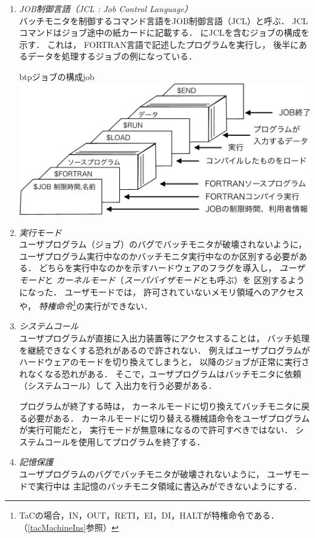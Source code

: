 \begin{enumerate}
\item \emph{JOB制御言語（JCL : Job Control Language）} \\
  バッチモニタを制御するコマンド言語をJOB制御言語（JCL）と呼ぶ．
  JCLコマンドはジョブ途中の紙カードに記載する．
  にJCLを含むジョブの構成を示す．
  これは，
  FORTRAN言語で記述したプログラムを実行し，
  後半にあるデータを処理するジョブの例になっている．

  \begin{myfig}{btp}{ジョブの構成}{job}
    \includegraphics[scale=0.6]{Fig/job-crop.pdf}
  \end{myfig}

\item \emph{実行モード} \\
  ユーザプログラム（ジョブ）のバグでバッチモニタが破壊されないように，
  ユーザプログラム実行中なのかバッチモニタ実行中なのか区別する必要がある．
  どちらを実行中なのかを示すハードウェアのフラグを導入し，
  \emph{ユーザモード}と
  \emph{カーネルモード}（\emph{スーパバイザモード}とも呼ぶ）を
  区別するようになった．
  ユーザモードでは，
  許可されていないメモリ領域へのアクセスや，
  \emph{特権命令}\footnote{
    TaCの場合，IN，OUT，RETI，EI，DI，HALTが特権命令である．
    （\ref{tacMachineIns}参照）
  }の実行ができない．

\item \emph{システムコール} \\
  ユーザプログラムが直接に入出力装置等にアクセスすることは，
  バッチ処理を継続できなくする恐れがあるので許されない．
  例えばユーザプログラムがハードウェアのモードを切り換えてしまうと，
  以降のジョブが正常に実行されなくなる恐れがある．
  そこで，ユーザプログラムはバッチモニタに依頼（システムコール）して
  入出力を行う必要がある．

  プログラムが終了する時は，
  カーネルモードに切り換えてバッチモニタに戻る必要がある．
  カーネルモードに切り替える機械語命令をユーザプログラムが実行可能だと，
  実行モードが無意味になるので許可すべきではない．
  システムコールを使用してプログラムを終了する．

\item \emph{記憶保護} \\
  ユーザプログラムのバグでバッチモニタが破壊されないように，
  ユーザモードで実行中は
  主記憶のバッチモニタ領域に書込みができないようにする．
\end{enumerate}

